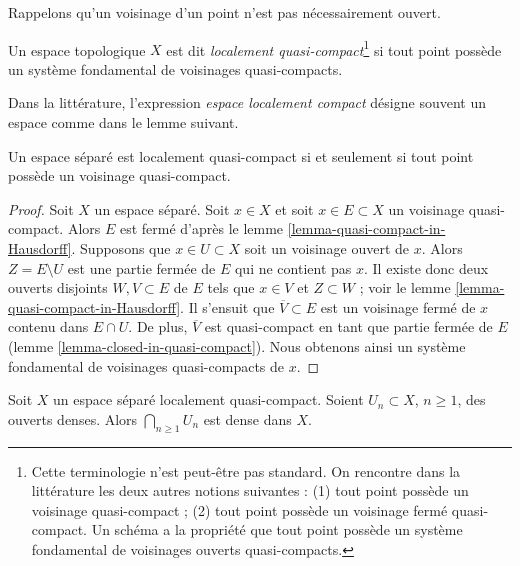 \noindent
Rappelons qu'un voisinage d'un point n'est pas nécessairement ouvert.

\begin{definition}
\label{definition-locally-quasi-compact}
Un espace topologique $X$ est dit {\it localement
quasi-compact}\footnote{Cette terminologie n'est peut-être pas standard.
On rencontre dans la littérature les deux autres notions suivantes : (1) tout
point possède un voisinage quasi-compact ; (2) tout point possède un voisinage
fermé quasi-compact. Un schéma a la propriété que tout point possède un système
fondamental de voisinages ouverts quasi-compacts.} si tout point possède un
système fondamental de voisinages quasi-compacts.
\end{definition}

\noindent
Dans la littérature, l'expression {\it espace localement compact} désigne
souvent un espace comme dans le lemme suivant.

\begin{lemma}
\label{lemma-locally-quasi-compact-Hausdorff}
Un espace séparé est localement quasi-compact si et seulement si tout point
possède un voisinage quasi-compact.
\end{lemma}

\begin{proof}
Soit $X$ un espace séparé. Soit $x \in X$ et soit
$x \in E \subset X$ un voisinage quasi-compact. Alors $E$ est fermé d'après le
lemme \ref{lemma-quasi-compact-in-Hausdorff}.
Supposons que $x \in U \subset X$ soit un voisinage ouvert de $x$.
Alors $Z = E \setminus U$ est une partie fermée de $E$ qui ne contient pas
$x$. Il existe donc deux ouverts disjoints $W, V \subset E$ de $E$ tels que
$x \in V$ et $Z \subset W$ ; voir le
lemme \ref{lemma-quasi-compact-in-Hausdorff}.
Il s'ensuit que $\overline{V} \subset E$ est un voisinage fermé de $x$ contenu
dans $E \cap U$. De plus, $\overline{V}$ est quasi-compact en tant que partie
fermée de $E$ (lemme \ref{lemma-closed-in-quasi-compact}).
Nous obtenons ainsi un système fondamental de voisinages quasi-compacts de $x$.
\end{proof}

\begin{lemma}
\label{lemma-baire-category-locally-compact}
Soit $X$ un espace séparé localement quasi-compact.
Soient $U_n \subset X$, $n \geq 1$, des ouverts denses. Alors
$\bigcap_{n \geq 1} U_n$ est dense dans $X$.
\end{lemma}

